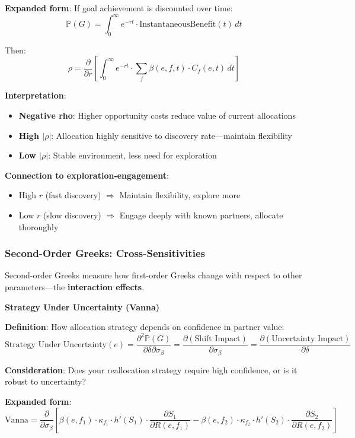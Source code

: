 \textbf{Expanded form}: If goal achievement is discounted over time:
\[ \mathbb{P}(G) = \int_0^\infty e^{-rt} \cdot \text{InstantaneousBenefit}(t) \, dt \]

Then:
\[ \rho = \frac{\partial}{\partial r} \left[\int_0^\infty e^{-rt} \cdot \sum_f \beta(e,f,t) \cdot C_f(e,t) \, dt\right] \]

\textbf{Interpretation}:
\begin{itemize}
\item \textbf{Negative rho}: Higher opportunity costs reduce value of current allocations
\item \textbf{High $|\rho|$}: Allocation highly sensitive to discovery rate---maintain flexibility
\item \textbf{Low $|\rho|$}: Stable environment, less need for exploration
\end{itemize}

\textbf{Connection to exploration-engagement}: 
\begin{itemize}
\item High $r$ (fast discovery) $\Rightarrow$ Maintain flexibility, explore more
\item Low $r$ (slow discovery) $\Rightarrow$ Engage deeply with known partners, allocate thoroughly
\end{itemize}

\subsubsection{Second-Order Greeks: Cross-Sensitivities}

Second-order Greeks measure how first-order Greeks change with respect to other parameters---the \textbf{interaction effects}.

\textbf{Strategy Under Uncertainty (Vanna)}

\textbf{Definition}: How allocation strategy depends on confidence in partner value:
\[ \text{Strategy Under Uncertainty}(e) = \frac{\partial^2 \mathbb{P}(G)}{\partial \delta \partial \sigma_\beta} = \frac{\partial (\text{Shift Impact})}{\partial \sigma_\beta} = \frac{\partial (\text{Uncertainty Impact})}{\partial \delta} \]

\textbf{Consideration}: Does your reallocation strategy require high confidence, or is it robust to uncertainty?

\textbf{Expanded form}:
\[ \text{Vanna} = \frac{\partial}{\partial \sigma_\beta} \left[\beta(e,f_1) \cdot \kappa_{f_1} \cdot h'(S_1) \cdot \frac{\partial S_1}{\partial R(e,f_1)} - \beta(e,f_2) \cdot \kappa_{f_2} \cdot h'(S_2) \cdot \frac{\partial S_2}{\partial R(e,f_2)}\right] \]

